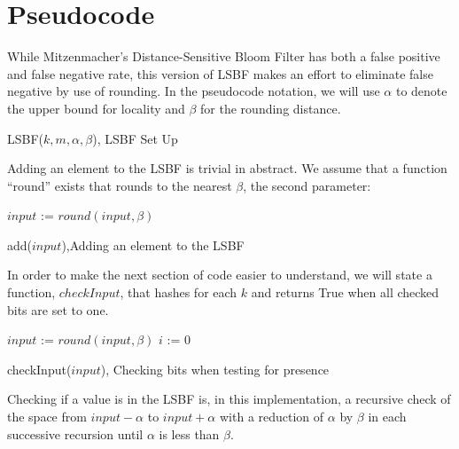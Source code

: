 \section{Pseudocode}

While Mitzenmacher's Distance-Sensitive Bloom Filter has both a false positive and false negative rate\cite{DSBF}, this version of LSBF makes an effort to eliminate false negative by use of rounding. In the pseudocode notation, we will use $\alpha$ to denote the upper bound for locality and $\beta$ for the rounding distance.

\begin{algorithm}[H]
	\caption{LSBF($k, m, \alpha, \beta$), LSBF Set Up}
\end{algorithm}

Adding an element to the LSBF is trivial in abstract. We assume that a function ``round'' exists that rounds to the nearest $\beta$, the second parameter:

\begin{algorithm}[H]
	$input$ := $round(input, \beta)$\;
\caption{add($ input $),Adding an element to the LSBF}
\end{algorithm}

In order to make the next section of code easier to understand, we will state a function, $checkInput$, that hashes for each $k$ and returns True when all checked bits are set to one.

\begin{algorithm}
	$input$ := $round(input, \beta)$\;
	$i$ := 0\;
	\caption{checkInput($ input $), Checking bits when testing for presence}
\end{algorithm}

Checking if a value is in the LSBF is, in this implementation, a recursive check of the space from $input - \alpha$ to $input + \alpha$ with a reduction of $\alpha$ by $\beta$ in each successive recursion until $\alpha$ is less than $\beta$.

